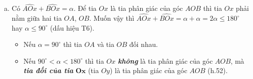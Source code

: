 \begin{vd}
{\begin{enumerate}[a)]
			\begin{luuy}
				Nếu vẽ tia $ Oy $ là tia đối tia $ Ox $, ta có hai góc $ AOy $ và $ AOx $ là hai góc kề bù nên: $ \widehat{AOy}=180^\circ -\widehat{AOx}=180^\circ -30^\circ =50^\circ $. Tương tự $ \widehat{BOy}=50^\circ $.
			\end{luuy}
			Lại có $ \widehat{AOy}+\widehat{BOy}=50^\circ +50^\circ =100^\circ <180^\circ $ nên tia $ Oy $ nằm giữa hai tia $ OA $ và $ OB $.\\
			Vậy tia $ Oy $ là tia phân giác của góc $ AOB $.
			\item Có $ \widehat{AOx}+\widehat{BOx}=\alpha $. Để tia $ Ox $ là tia phân giác của góc $ AOB $ thì tia $ Ox $ phải nằm giữa hai tia $ OA $, $ OB $. Muốn vậy thì $ \widehat{AOx}+\widehat{BOx}=\alpha +\alpha =2\alpha \le 180^\circ $ hay $ \alpha \le 90^\circ $ (dấu hiệu T6).
			\begin{luuy}
				\begin{itemize}
					\item Nếu $ \alpha =90^\circ $ thì tia $ OA $ và tia $ OB $ đối nhau.
					\item Nếu $ 90^\circ <\alpha <180^\circ $ thì tia $ Ox $ \textit{\textbf{không}} là tia phân giác của góc $ AOB $, mà \textit{\textbf{tia đối của tia }} $ \mathbf{Ox} $ (tia $ Oy $) là tia phân giác của góc $ AOB $ (h.52).
				\end{itemize}
			\end{luuy}
		\end{enumerate}
	}
\end{vd}

